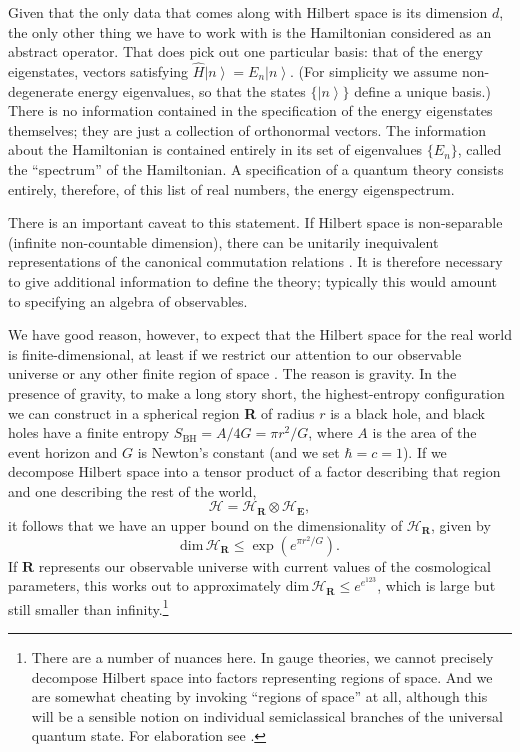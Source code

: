\documentclass[12pt,english]{article}
\newcommand{\be}{\begin{equation}}
\newcommand{\ee}{\end{equation}}
\newcommand{\ham}{\hat{H}}
\newcommand{\HH}{\mathcal{H}}
\newcommand{\ket}[1]{\left| #1 \right\rangle}
\begin{document}
Given that the only data that comes along with Hilbert space is its dimension $d$, the only other thing we have to work with is the Hamiltonian considered as an abstract operator.
That does pick out one particular basis: that of the energy eigenstates, vectors satisfying $\ham \ket{n} = E_n\ket{n}$.
(For simplicity we assume non-degenerate energy eigenvalues, so that the states $\{\ket{n}\}$ define a unique basis.)
There is no information contained in the specification of the energy eigenstates themselves; they are just a collection of orthonormal vectors.
The information about the Hamiltonian is contained entirely in its set of eigenvalues $\{E_n\}$, called the ``spectrum'' of the Hamiltonian.
A specification of a quantum theory consists entirely, therefore, of this list of real numbers, the energy eigenspectrum.

There is an important caveat to this statement.
If Hilbert space is non-separable (infinite non-countable dimension), there can be unitarily inequivalent representations of the canonical commutation relations \citep{haag55}.
It is therefore necessary to give additional information to define the theory; typically this would amount to specifying an algebra of observables.

We have good reason, however, to expect that the Hilbert space for the real world is finite-dimensional, at least if we restrict our attention to our observable universe or any other finite region of space \citep{Bekenstein:1980jp,bousso1999,Banks:2000fe,Jacobson:2012yt,Bao:2017rnv}.
The reason is gravity.
In the presence of gravity, to make a long story short, the highest-entropy configuration we can construct in a spherical region \textbf{R} of radius $r$ is a black hole, and black holes have a finite entropy $S_\mathrm{BH} = A/4G = \pi r^2/G$, where $A$ is the area of the event horizon and $G$ is Newton's constant (and we set $\hbar=c=1$).
If we decompose Hilbert space into a tensor product of a factor describing that region and one describing the rest of the world,
\be
\HH = \HH_\mathbf{R}\otimes \HH_\mathbf{E},
\label{factorization}
\ee
it follows that we have an upper bound on the dimensionality of $\HH_\mathbf{R}$, given by
\be
  \mathrm{dim}\,\HH_\mathbf{R} \leq \exp{(e^{\pi r^2/G})}.
\ee
If $\mathbf{R}$ represents our observable universe with current values of the cosmological parameters, this works out to approximately $ \mathrm{dim}\,\HH_\mathbf{R} \leq e^{e^{123}}$, which is large but still smaller than infinity.\footnote{There are a number of nuances here. In gauge theories, we cannot precisely decompose Hilbert space into factors representing regions of space. And we are somewhat cheating by invoking ``regions of space'' at all, although this will be a sensible notion on individual semiclassical branches of the universal quantum state. For elaboration see \citep{Bao:2017rnv}.}
\end{document}
